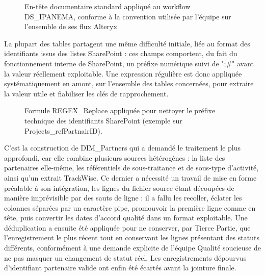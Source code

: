 \begin{figure}[H]
    \centering
    \caption{En-tête documentaire standard appliqué au workflow DS\_IPANEMA, conforme à la convention utilisée par l'équipe sur l'ensemble de ses flux Alteryx}
    \label{documentaire_standard_appliqué_au_workflow_DS_IPANEMA}
\end{figure}

La plupart des tables partagent une même difficulté initiale, liée au format des identifiants issus 
des listes SharePoint : ces champs comportent, du fait du fonctionnement interne de 
SharePoint, un préfixe numérique suivi de ";\#" avant la valeur réellement exploitable. Une 
expression régulière est donc appliquée systématiquement en amont, sur l'ensemble des 
tables concernées, pour extraire la valeur utile et fiabiliser les clés de rapprochement.

\begin{figure}[H]
    \centering
    \caption{Formule REGEX\_Replace appliquée pour nettoyer le préfixe technique des identifiants SharePoint (exemple sur Projects\_refPartnairID).}
    \label{Formule_REGEX_Replace_appliquée_pour_nettoyer_le_préfixe}
\end{figure}

C'est la construction de DIM\_Partners qui a demandé le traitement le plus approfondi, 
car elle combine plusieurs sources hétérogènes : la liste des partenaires elle-même, les 
référentiels de sous-traitance et de sous-type d'activité, ainsi qu'un extrait TrackWise. Ce 
dernier a nécessité un travail de mise en forme préalable à son intégration, les lignes du fichier 
source étant découpées de manière imprévisible par des sauts de ligne : il a fallu les recoller, 
éclater les colonnes séparées par un caractère pipe, promouvoir la première ligne comme en
tête, puis convertir les dates d'accord qualité dans un format exploitable. Une déduplication a 
ensuite été appliquée pour ne conserver, par Tierce Partie, que l'enregistrement le plus récent 
tout en conservant les lignes présentant des statuts différents, conformément à une demande 
explicite de l'équipe Qualité soucieuse de ne pas masquer un changement de statut réel. Les 
enregistrements dépourvus d'identifiant partenaire valide ont enfin été écartés avant la jointure 
finale. \\

